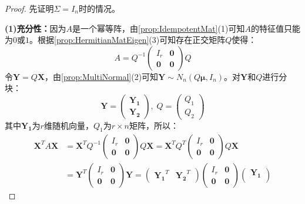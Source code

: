 \begin{proof}
	先证明$\Sigma=I_n$时的情况。\par
	\textbf{(1)充分性：}因为$A$是一个幂等阵，由\cref{prop:IdempotentMat}(1)可知$A$的特征值只能为$0$或$1$。根据\cref{prop:HermitianMatEigen}(3)可知存在正交矩阵$Q$使得：
	\begin{equation*}
		A=Q^{-1}
		\begin{pmatrix}
			I_r & \mathbf{0} \\
			\mathbf{0} & \mathbf{0}
		\end{pmatrix}Q
	\end{equation*}
	令$\mathbf{Y}=Q\mathbf{X}$，由\cref{prop:MultiNormal}(2)可知$\mathbf{Y}\sim N_n(Q\boldsymbol{\mu},I_n)$。对$\mathbf{Y}$和$Q$进行分块：
	\begin{equation*}
		\mathbf{Y}=
		\begin{pmatrix}
			\mathbf{Y_1} \\
			\mathbf{Y_2}
		\end{pmatrix},\;
		Q=
		\begin{pmatrix}
			Q_1 \\
			Q_2
		\end{pmatrix}
	\end{equation*}
	其中$\mathbf{Y_1}$为$r$维随机向量，$Q_1$为$r\times n$矩阵，所以：
	\begin{align*}
		\mathbf{X}^TA\mathbf{X}&=\mathbf{X}^TQ^{-1}
		\begin{pmatrix}
			I_r & \mathbf{0} \\
			\mathbf{0} & \mathbf{0}
		\end{pmatrix}Q\mathbf{X}=\mathbf{X}^TQ^T
		\begin{pmatrix}
			I_r & \mathbf{0} \\
			\mathbf{0} & \mathbf{0}
		\end{pmatrix}Q\mathbf{X} \\
		&=\mathbf{Y}^T
		\begin{pmatrix}
			I_r & \mathbf{0} \\
			\mathbf{0} & \mathbf{0}
		\end{pmatrix}\mathbf{Y}
		=
		\begin{pmatrix}
			\mathbf{Y_1}^T & \mathbf{Y_2}^T
		\end{pmatrix}
		\begin{pmatrix}
			I_r & \mathbf{0} \\
			\mathbf{0} & \mathbf{0}
		\end{pmatrix}
		\begin{pmatrix}
			\mathbf{Y_1} \\

\end{pmatrix}
\end{align*}
\end{proof}
